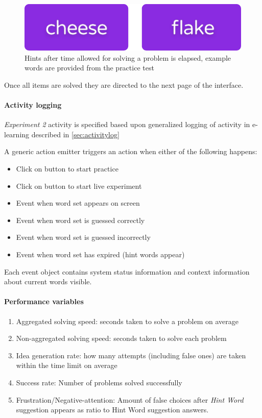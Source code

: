 		\begin{figure}
			\centering
			\includegraphics[width=0.3\linewidth]{graphics/Hint-buttons}
			\caption{Hints after time allowed for solving a problem is elapsed, example words are provided from the practice test}
			\label{fig:hint-buttons}
		\end{figure}
		
		Once all items are solved they are directed to the next page of the interface.
				
		\paragraph{Activity logging} \textit{Experiment 2} activity is specified based upon generalized logging of activity in e-learning described in \ref{sec:activitylog}
		
		A generic action emitter triggers an action when either of the following happens:
		
		\begin{itemize}
			\item Click on button to start practice
			\item Click on button to start live experiment
			\item Event when word set appears on screen
			\item Event when word set is guessed correctly
			\item Event when word set is guessed incorrectly
			\item Event when word set has expired (hint words appear)
		\end{itemize}
	
		Each event object contains system status information and context information about current words visible.

		\paragraph{Performance variables} \label{sec:creativity-parameters}
		
		\begin{enumerate}
			\item Aggregated solving speed: seconds taken to solve a problem on average
			\item Non-aggregated solving speed: seconds taken to solve each problem
			\item Idea generation rate: how many attempts (including false ones) are taken within the time limit on average
			\item Success rate: Number of problems solved successfully
			\item Frustration/Negative-attention: Amount of false choices after \textit{Hint Word} suggestion appears as ratio to Hint Word suggestion answers.
		\end{enumerate}
	

